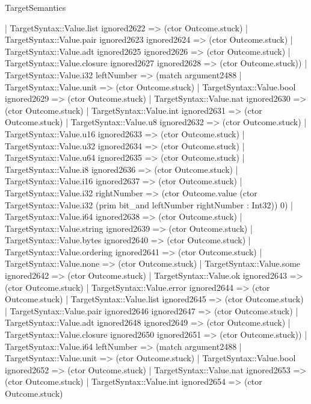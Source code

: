 \begin{lexlean}{TargetSemantics}
\begin{semanticmodule}
{              | TargetSyntax::Value.list ignored2622 => (ctor Outcome.stuck)
              | TargetSyntax::Value.pair ignored2623 ignored2624 => (ctor Outcome.stuck)
              | TargetSyntax::Value.adt ignored2625 ignored2626 => (ctor Outcome.stuck)
              | TargetSyntax::Value.closure ignored2627 ignored2628 => (ctor Outcome.stuck))
            | TargetSyntax::Value.i32 leftNumber => (match argument2488
              | TargetSyntax::Value.unit => (ctor Outcome.stuck)
              | TargetSyntax::Value.bool ignored2629 => (ctor Outcome.stuck)
              | TargetSyntax::Value.nat ignored2630 => (ctor Outcome.stuck)
              | TargetSyntax::Value.int ignored2631 => (ctor Outcome.stuck)
              | TargetSyntax::Value.u8 ignored2632 => (ctor Outcome.stuck)
              | TargetSyntax::Value.u16 ignored2633 => (ctor Outcome.stuck)
              | TargetSyntax::Value.u32 ignored2634 => (ctor Outcome.stuck)
              | TargetSyntax::Value.u64 ignored2635 => (ctor Outcome.stuck)
              | TargetSyntax::Value.i8 ignored2636 => (ctor Outcome.stuck)
              | TargetSyntax::Value.i16 ignored2637 => (ctor Outcome.stuck)
              | TargetSyntax::Value.i32 rightNumber => (ctor Outcome.value (ctor TargetSyntax::Value.i32 (prim bit_and leftNumber rightNumber : Int32)) 0)
              | TargetSyntax::Value.i64 ignored2638 => (ctor Outcome.stuck)
              | TargetSyntax::Value.string ignored2639 => (ctor Outcome.stuck)
              | TargetSyntax::Value.bytes ignored2640 => (ctor Outcome.stuck)
              | TargetSyntax::Value.ordering ignored2641 => (ctor Outcome.stuck)
              | TargetSyntax::Value.none => (ctor Outcome.stuck)
              | TargetSyntax::Value.some ignored2642 => (ctor Outcome.stuck)
              | TargetSyntax::Value.ok ignored2643 => (ctor Outcome.stuck)
              | TargetSyntax::Value.error ignored2644 => (ctor Outcome.stuck)
              | TargetSyntax::Value.list ignored2645 => (ctor Outcome.stuck)
              | TargetSyntax::Value.pair ignored2646 ignored2647 => (ctor Outcome.stuck)
              | TargetSyntax::Value.adt ignored2648 ignored2649 => (ctor Outcome.stuck)
              | TargetSyntax::Value.closure ignored2650 ignored2651 => (ctor Outcome.stuck))
            | TargetSyntax::Value.i64 leftNumber => (match argument2488
              | TargetSyntax::Value.unit => (ctor Outcome.stuck)
              | TargetSyntax::Value.bool ignored2652 => (ctor Outcome.stuck)
              | TargetSyntax::Value.nat ignored2653 => (ctor Outcome.stuck)
              | TargetSyntax::Value.int ignored2654 => (ctor Outcome.stuck)
}
\end{semanticmodule}
\end{lexlean}
